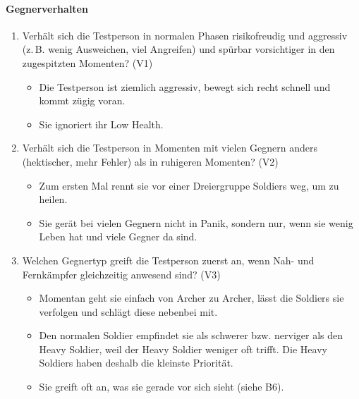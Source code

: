 \documentclass[../Main.tex]{subfiles}
\begin{document}
\paragraph{Gegnerverhalten}
\begin{enumerate}[label=\textbf{B\arabic*}, leftmargin=1.5cm, itemsep=0.8em]
    \item Verhält sich die Testperson in normalen Phasen risikofreudig und aggressiv (z.\,B. wenig Ausweichen, viel Angreifen) und spürbar vorsichtiger in den zugespitzten Momenten? \hfill (V1)
    \begin{itemize}[nosep]
        \item Die Testperson ist ziemlich aggressiv, bewegt sich recht schnell und kommt zügig voran.
        \item Sie ignoriert ihr Low Health.
    \end{itemize}

    \item Verhält sich die Testperson in Momenten mit vielen Gegnern anders (hektischer, mehr Fehler) als in ruhigeren Momenten? \hfill (V2)
    \begin{itemize}[nosep]
        \item Zum ersten Mal rennt sie vor einer Dreiergruppe Soldiers weg, um zu heilen.
        \item Sie gerät bei vielen Gegnern nicht in Panik, sondern nur, wenn sie wenig Leben hat und viele Gegner da sind.
    \end{itemize}

    \item Welchen Gegnertyp greift die Testperson zuerst an, wenn Nah- und Fernkämpfer gleichzeitig anwesend sind? \hfill (V3)
    \begin{itemize}[nosep]
        \item Momentan geht sie einfach von Archer zu Archer, lässt die Soldiers sie verfolgen und schlägt diese nebenbei mit.
        \item Den normalen Soldier empfindet sie als schwerer bzw. nerviger als den Heavy Soldier, weil der Heavy Soldier weniger oft trifft. Die Heavy Soldiers haben deshalb die kleinste Priorität.
        \item Sie greift oft an, was sie gerade vor sich sieht (siehe B6).
    \end{itemize}


\end{enumerate}
\end{document}
